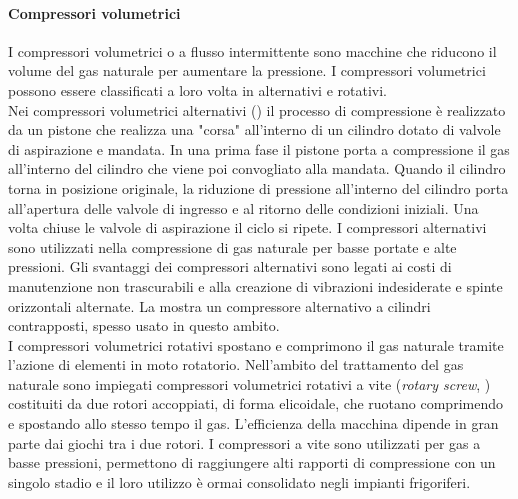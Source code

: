 \paragraph{Compressori volumetrici}
I compressori volumetrici o a flusso intermittente sono macchine che riducono il volume del gas naturale per aumentare la pressione. I compressori volumetrici possono essere classificati a loro volta in alternativi e rotativi.\\
Nei compressori volumetrici alternativi () il processo di compressione è realizzato da un pistone che realizza una "corsa" all'interno di un cilindro dotato di valvole di aspirazione e mandata. In una prima fase il pistone porta a compressione il gas all'interno del cilindro che viene poi convogliato alla mandata. Quando il cilindro torna in posizione originale, la riduzione di pressione all'interno del cilindro porta all'apertura delle valvole di ingresso e al ritorno delle condizioni iniziali. Una volta chiuse le valvole di aspirazione il ciclo si ripete. I compressori alternativi sono utilizzati nella compressione di gas naturale per basse portate e alte pressioni.%
Gli svantaggi dei compressori alternativi sono legati ai costi di manutenzione non trascurabili e alla creazione di vibrazioni indesiderate e spinte orizzontali alternate. La  mostra un compressore alternativo a cilindri contrapposti, spesso usato in questo ambito.\\
I compressori volumetrici rotativi spostano e comprimono il gas naturale tramite l'azione di elementi in moto rotatorio. Nell'ambito del trattamento del gas naturale sono impiegati compressori volumetrici rotativi a vite (\textit{rotary screw}, ) costituiti da due rotori accoppiati, di forma elicoidale, che ruotano comprimendo e spostando allo stesso tempo il gas. L'efficienza della macchina dipende in gran parte dai giochi tra i due rotori. I compressori a vite sono utilizzati per gas a basse pressioni, permettono di raggiungere alti rapporti di compressione con un singolo stadio e il loro utilizzo è ormai consolidato negli impianti frigoriferi. 
